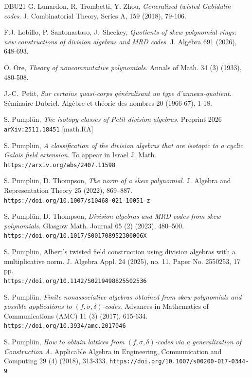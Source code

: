 \documentclass[12pt]{amsart}
\theoremstyle{plain}
\theoremstyle{definition}
\numberwithin{equation}{section}
\numberwithin{figure}{section}
\begin{document}
\begin{thebibliography}{DBU{\etalchar{+}}21}
 G. Lunardon, R. Trombetti, Y. Zhou, \emph{Generalized twisted Gabidulin codes}. J. Combinatorial Theory, Series A, 159 (2018), 79-106.


  F.J. Lobillo, P. Santonastaso, J.~Sheekey, \emph{Quotients of skew polynomial rings: new constructions of
division algebras and MRD codes}. J. Algebra 691 (2026), 648-693.

 O. Ore, \emph{Theory of noncommutative polynomials.} Annals of Math. 34 (3) (1933), 480-508.


 J.-C.~Petit, \emph{Sur certains quasi-corps g\'{e}n\'{e}ralisant un type d'anneau-quotient}.
 S\'{e}minaire Dubriel. Alg\`{e}bre et th\'{e}orie des nombres 20 (1966-67), 1-18.

  S. Pumpl\"un,  \emph{The isotopy classes of Petit division algebras.}
 Preprint 2026
\\ \verb#arXiv:2511.18451# [math.RA]


 S. Pumpl\"un, \emph{A classification of the division algebras that are isotopic to a cyclic Galois field extension}.  To appear in Israel J. Math.
  \\  \verb#https://arxiv.org/abs/2407.11598#

  S. Pumpl\"un, D. Thompson, \emph{The norm of a skew polynomial.}
 J. Algebra and Representation Theory 25 (2022), 869–887.
\\
 \verb#https://doi.org/10.1007/s10468-021-10051-z#

  S. Pumpl\"un, D. Thompson,  \emph{Division algebras and MRD codes from skew polynomials.}
   Glasgow Math. Journal 65 (2) (2023), 480--500.
  \verb#https://doi.org/10.1017/S001708952300006X#

    S. Pumpl\"un, {Albert's twisted field construction using division algebras with a multiplicative norm.}
J. Algebra Appl. 24 (2025), no. 11, Paper No. 2550253, 17 pp.
\\
\verb#https://doi.org/10.1142/S0219498825502536#


    S. Pumpl\"un, \emph{Finite nonassociative algebras obtained from skew polynomials  and possible applications to $(f,\sigma,\delta)$-codes}. Advances in Mathematics of Communications (AMC) 11 (3) (2017), 615-634.
    \verb#https://doi.org/10.3934/amc.2017046#


  S. Pumpl\"un, \emph{How to obtain lattices from $(f,\sigma,\delta)$-codes via a generalization of Construction A.}
Applicable Algebra in Engineering, Communication and Computing 29 (4) (2018), 313-333.
\verb#https://doi.org/10.1007/s00200-017-0344-9#



\end{thebibliography}
\end{document}
